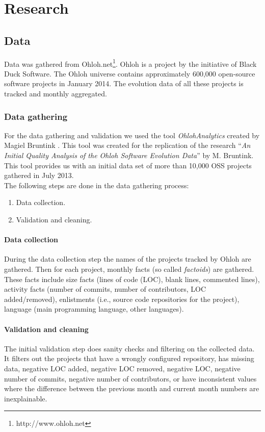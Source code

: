 \chapter{Research}
\label{research}

\section{Data}
Data was gathered from Ohloh.net\footnote{http://www.ohloh.net}. Ohloh is a
project by the initiative of Black Duck Software. The Ohloh universe contains
approximately 600,000 open-source software projects in January 2014. The
evolution data of all these projects is tracked and monthly aggregated.

\subsection{Data gathering}
For the data gathering and validation we used the tool \emph{OhlohAnalytics }\rm
created by Magiel Bruntink \cite{ohlohanalytics}. This tool was created for the
replication of the research ``\emph{An Initial Quality Analysis of the Ohloh
Software Evolution Data}\rm'' by M. Bruntink. This tool provides us with an
initial data set of more than 10,000 OSS projects gathered in July 2013.\\

\noindent
The following steps are done in the data gathering process:
\begin{enumerate}
	\item Data collection.
	\item Validation and cleaning.
\end{enumerate}

\subsubsection{Data collection}
During the data collection step the names of the projects tracked by Ohloh are
gathered. Then for each project, monthly facts (so called \emph{factoids}\rm)
are gathered.
These facts include size facts (lines of code (LOC), blank lines, commented lines), activity facts
(number of commits, number of contributors, LOC added/removed), enlistments
(i.e., source code repositories for the project), language (main programming
language, other languages).

\subsubsection{Validation and cleaning}
The initial validation step does sanity checks and filtering on the collected
data. It filters out the projects that have a wrongly configured repository,
has missing data, negative LOC added, negative LOC removed, negative LOC,
negative number of commits, negative number of contributors, or have
inconsistent values where the difference between the previous month and current
month numbers are inexplainable.

